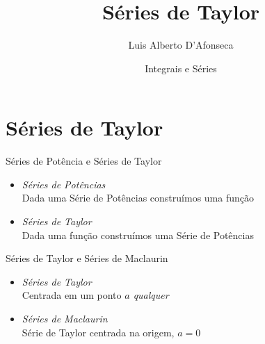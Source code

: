 
\usepackage{apresentacao}
\usepackage{mathconfig}
\usepackage{tabto}

\makeatletter
\graphicspath  {{./figs/}}
\makeatother

\setcounter{exemplo}{0}

\title {Séries de Taylor}
\author{\large Luis Alberto D'Afonseca}
\date  {Integrais e Séries}



\begin{frame}
    \titlepage
\end{frame}

\section{Séries de Taylor}

\begin{frame}{Séries de Potência e Séries de Taylor}
  \begin{itemize}[<+->]
    \item \emph{Séries de Potências} \\[3mm]
          Dada uma Série de Potências construímos uma função \\[11mm]
    \item \emph{Séries de Taylor}   \\[3mm]
          Dada uma função construímos uma Série de Potências
  \end{itemize}
\end{frame}

\begin{frame}{Séries de Taylor e Séries de Maclaurin}
  \begin{itemize}[<+->]
    \item \emph{Séries de Taylor}   \\[3mm]
    Centrada em um ponto \emph{$a$ qualquer} \\[11mm]
    \item \emph{Séries de Maclaurin}   \\[3mm]
    Série de Taylor centrada na origem, \emph{$a=0$}
  \end{itemize}
\end{frame}

